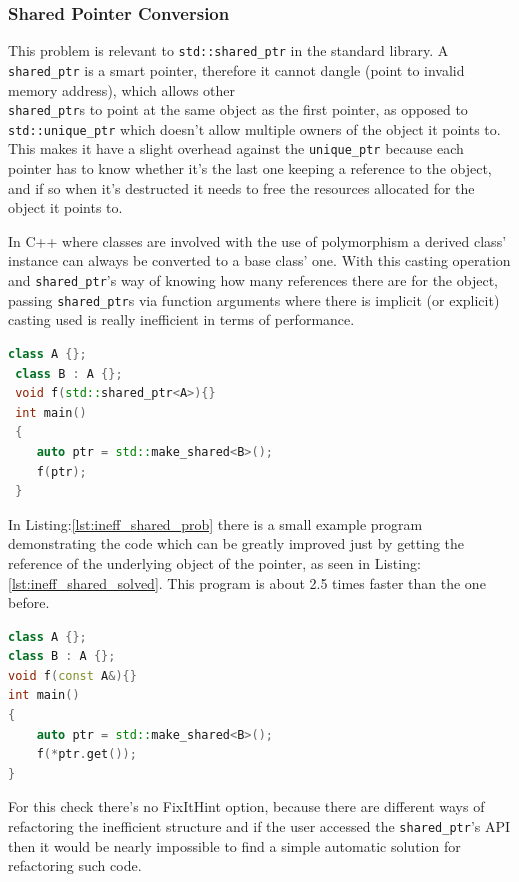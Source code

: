  \subsubsection{Shared Pointer Conversion}
 \par This problem is relevant to \verb|std::shared_ptr| in the standard library. A \verb|shared_ptr| is a smart pointer, therefore it cannot dangle (point to invalid memory address), which allows other \\\verb|shared_ptr|s to point at the same object as the first pointer, as opposed to \verb|std::unique_ptr| which doesn't allow multiple owners of the object it points to. This makes it have a slight overhead against the \verb|unique_ptr| because each pointer has to know whether it's the last one keeping a reference to the object, and if so when it's destructed it needs to free the resources allocated for the object it points to. \medskip
 \par In C++ where classes are involved with the use of polymorphism a derived class' instance can always be converted to a base class' one. With this casting operation and \verb|shared_ptr|'s way of knowing how many references there are for the object, passing \verb|shared_ptr|s via function arguments where there is implicit (or explicit) casting used is really inefficient in terms of performance. \medskip
 \begin{lstlisting}[language=c++, frame=single ,caption={Inefficient implicit cast}, label={lst:ineff_shared_prob}]
 class A {};
 class B : A {};
 void f(std::shared_ptr<A>){}
 int main()
 {
 	auto ptr = std::make_shared<B>();
 	f(ptr);
 } 
\end{lstlisting}
\par In Listing:\ref{lst:ineff_shared_prob} there is a small example program demonstrating the code which can be greatly improved just by getting the reference of the underlying object of the pointer, as seen in Listing:\ref{lst:ineff_shared_solved}. This program is about 2.5 times faster than the one before. 
\begin{lstlisting}[language=c++, frame=single ,caption={A much faster version}, label={lst:ineff_shared_solved}]
class A {};
class B : A {};
void f(const A&){}
int main()
{
	auto ptr = std::make_shared<B>();
	f(*ptr.get());
}
\end{lstlisting}
\par For this check there's no FixItHint option, because there are different ways of refactoring the inefficient structure and if the user accessed the \verb|shared_ptr|'s API then it would be nearly impossible to find a simple automatic solution for refactoring such code. 
